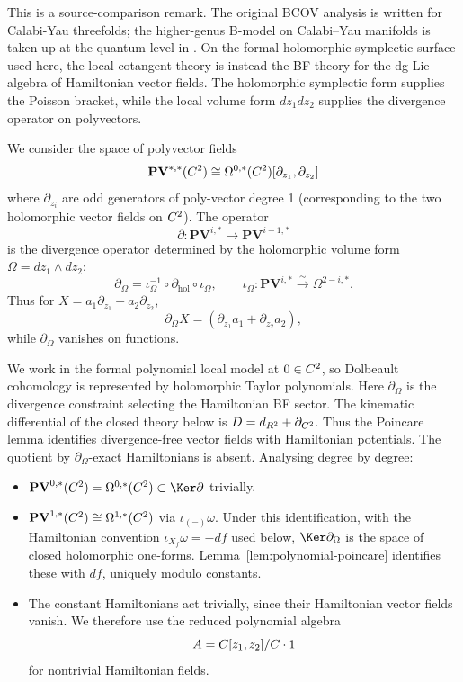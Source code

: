 \documentclass[11pt]{memoir}
\begin{document}
\begin{rmk}
  This is a source-comparison remark. The original BCOV analysis
  \cite{bcov} is written for Calabi-Yau threefolds; the higher-genus
  B-model on Calabi--Yau manifolds is taken up at the quantum level in
  \cite{costello-li-quantum-bcov}. On the formal holomorphic symplectic
  surface used here, the local cotangent theory is instead the BF theory
  for the dg Lie algebra of Hamiltonian vector fields. The holomorphic
  symplectic form supplies the Poisson bracket, while the local volume
  form \(dz_1dz_2\) supplies the divergence operator on polyvectors.
\end{rmk}

We consider the space of polyvector fields
$$\mathbf{PV}^{*,*}(C^2) \cong \Omega^{0,*}(C^2)[\partial_{z_1},\partial_{z_2}]$$
where $\partial_{z_i}$ are odd generators of poly-vector degree 1 (corresponding
to the two holomorphic vector fields on $C^2$). The operator
$$\partial: \mathbf{PV}^{i,*} \to \mathbf{PV}^{i-1,*}$$
is the divergence operator determined by the holomorphic volume form
$\Omega=dz_1\wedge dz_2$:
$$\partial_{\Omega}=\iota_{\Omega}^{-1}\circ\partial_{\mathrm{hol}}\circ
  \iota_{\Omega},\qquad
  \iota_{\Omega}:\mathbf{PV}^{i,*}\xrightarrow{\sim}\Omega^{2-i,*}.$$
Thus for $X=a_1\partial_{z_1}+a_2\partial_{z_2}$,
$$\partial_{\Omega}X=(\partial_{z_1}a_1+\partial_{z_2}a_2),$$
while $\partial_{\Omega}$ vanishes on functions.

We work in the formal polynomial local model at $0\in C^2$, so Dolbeault
cohomology is represented by holomorphic Taylor polynomials. Here
$\partial_{\Omega}$ is the divergence constraint selecting the Hamiltonian BF
sector. The kinematic differential of the closed theory below is
$D=d_{R^2}+\partial_{C^2}$. Thus the Poincare lemma identifies
divergence-free vector fields with Hamiltonian potentials. The quotient by
$\partial_{\Omega}$-exact Hamiltonians is absent. Analysing degree by
degree:
\begin{itemize}
  \item $\mathbf{PV}^{0,*}(\C^2) = \Omega^{0,*}(\C^2)\subset\Ker\partial$
    trivially.
  \item $\mathbf{PV}^{1,*}(C^2)\cong\Omega^{1,*}(C^2)$ via
    $\iota_{(-)}\omega$. Under this identification, with the Hamiltonian
    convention $\iota_{X_f}\omega=-df$ used below,
    $\Ker\partial_{\Omega}$ is the space of closed holomorphic one-forms.
    Lemma~\ref{lem:polynomial-poincare} identifies these with $df$, uniquely
    modulo constants.
  \item The constant Hamiltonians act trivially, since their Hamiltonian vector
    fields vanish. We therefore use the reduced polynomial algebra
    $$A=C[z_1,z_2]/C\cdot1$$
    for nontrivial Hamiltonian fields.
\end{itemize}
\end{document}

